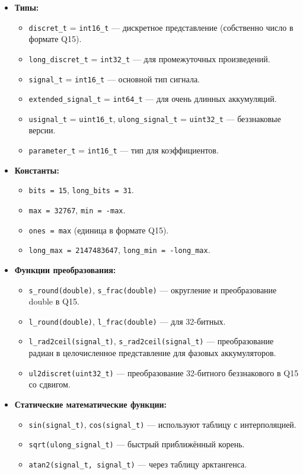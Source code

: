 \documentclass[a4paper,12pt]{article}
\begin{document}
\begin{itemize}
    \item \textbf{Типы:}
        \begin{itemize}
            \item \texttt{discret\_t} = \texttt{int16\_t} — дискретное представление (собственно число в формате Q15).
            \item \texttt{long\_discret\_t} = \texttt{int32\_t} — для промежуточных произведений.
            \item \texttt{signal\_t} = \texttt{int16\_t} — основной тип сигнала.
            \item \texttt{extended\_signal\_t} = \texttt{int64\_t} — для очень длинных аккумуляций.
            \item \texttt{usignal\_t} = \texttt{uint16\_t}, \texttt{ulong\_signal\_t} = \texttt{uint32\_t} — беззнаковые версии.
            \item \texttt{parameter\_t} = \texttt{int16\_t} — тип для коэффициентов.
        \end{itemize}
    \item \textbf{Константы:}
        \begin{itemize}
            \item \texttt{bits = 15}, \texttt{long\_bits = 31}.
            \item \texttt{max = 32767}, \texttt{min = -max}.
            \item \texttt{ones = max} (единица в формате Q15).
            \item \texttt{long\_max = 2147483647}, \texttt{long\_min = -long\_max}.
        \end{itemize}
    \item \textbf{Функции преобразования:}
        \begin{itemize}
            \item \texttt{s\_round(double)}, \texttt{s\_frac(double)} — округление и преобразование double в Q15.
            \item \texttt{l\_round(double)}, \texttt{l\_frac(double)} — для 32-битных.
            \item \texttt{l\_rad2ceil(signal\_t)}, \texttt{s\_rad2ceil(signal\_t)} — преобразование радиан в целочисленное представление для фазовых аккумуляторов.
            \item \texttt{ul2discret(uint32\_t)} — преобразование 32-битного беззнакового в Q15 со сдвигом.
        \end{itemize}
    \item \textbf{Статические математические функции:}
        \begin{itemize}
            \item \texttt{sin(signal\_t)}, \texttt{cos(signal\_t)} — используют таблицу с интерполяцией.
            \item \texttt{sqrt(ulong\_signal\_t)} — быстрый приближённый корень.
            \item \texttt{atan2(signal\_t, signal\_t)} — через таблицу арктангенса.
        \end{itemize}
\end{itemize}
\end{document}

